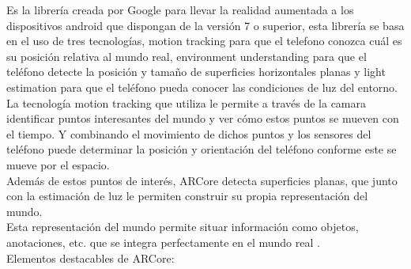 Es la librería creada por Google para llevar la realidad aumentada a los dispositivos android que dispongan de la versión 7 o superior, esta librería se basa en el uso de tres tecnologías, motion tracking para que el telefono conozca cuál es su posición relativa al mundo real, environment understanding para que el teléfono detecte la posición y tamaño de superficies horizontales planas y light estimation para que el teléfono pueda conocer las condiciones de luz del entorno.\\

La tecnología motion tracking que utiliza le permite a través de la camara identificar puntos interesantes del mundo y ver cómo estos puntos se mueven con el tiempo. Y combinando el movimiento de dichos puntos y los sensores del teléfono puede determinar la posición y orientación del teléfono conforme este se mueve por el espacio.\\

Además de estos puntos de interés, ARCore detecta superficies planas, que junto con la estimación de luz le permiten construir su propia representación del mundo.\\

Esta representación del mundo permite situar información como objetos, anotaciones, etc. que se integra perfectamente en el mundo real \cite{arcore}.\\

Elementos destacables de ARCore:

